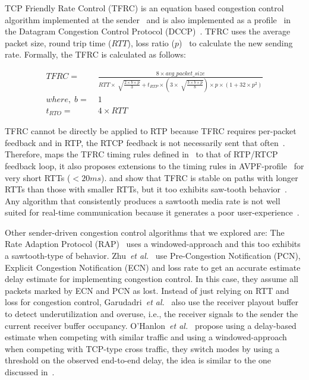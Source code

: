 TCP Friendly Rate Control (TFRC) is an equation based congestion control
algorithm implemented at the sender~\cite{tfrc_347397} and is also implemented
as a profile~\cite{rfc4342} in the Datagram Congestion Control Protocol
(DCCP)~\cite{rfc4340}. TFRC uses the average packet size, round trip time
($RTT$), loss ratio ($p$)~\cite{rfc3448} to calculate the new sending rate.
Formally, the TFRC is calculated as follows:

\begin{align*}
 TFRC = &\; \frac{8 \times avg\_packet\_size}
{RTT \times \sqrt[]{\frac{2 \times b \times p}{3}} + t_{RTP} \times 
\left( 3 \times \sqrt[]{\frac{3 \times b \times p}{8}}\right) \times p \times
\left( 1+32 \times p^2 \right)}\\
where,\; b = &\; 1\\
t_{RTO} = &\; 4 \times RTT
\end{align*}

TFRC cannot be directly be applied to RTP because TFRC requires per-packet
feedback and in RTP, the RTCP feedback is not necessarily sent that
often~\cite{draft.rmcat.feedback}. Therefore, \cite{draft.rtp.tfrc} maps the
TFRC timing rules defined in~\cite{rfc4828, rfc5348} to that of RTP/RTCP
feedback loop, it also proposes extensions to the timing rules in
AVPF-profile~\cite{rfc4585} for very short RTTs ($<20ms$).
\cite{Gharai06:ICME} and \cite{VladBalan:2007dq} show that TFRC is stable on
paths with longer RTTs than those with smaller RTTs, but it too exhibits
saw-tooth behavior~\cite{saurin:2006:thesis}. Any algorithm that consistently
produces a sawtooth media rate is not well suited for real-time communication
because it generates a poor user-experience~\cite{Gharai:2002wt,
Zink03subjectiveimpression}.

Other sender-driven congestion control algorithms that we explored are: The
Rate Adaption Protocol (RAP)~\cite{rap:752152} uses a windowed-approach and
this too exhibits a sawtooth-type of behavior. Zhu~\textit{et
al.}~\cite{rmcat-nada} use Pre-Congestion Notification (PCN), Explicit
Congestion Notification (ECN) and loss rate to get an accurate estimate delay
estimate for implementing congestion control. In this case, they assume all
packets marked by ECN and PCN as lost. Instead of just relying on RTT and loss
for congestion control, Garudadri~\textit{et al.}~\cite{4397059} also use the
receiver playout buffer to detect underutilization and overuse, i.e., the
receiver signals to the sender the current receiver buffer occupancy.
O'Hanlon~\textit{et al.}~\cite{rmcat-dflow} propose using a delay-based
estimate when competing with similar traffic and using a windowed-approach
when competing with TCP-type cross traffic, they switch modes by using a
threshold on the observed end-to-end delay, the idea is similar to the one
discussed in~\cite{budzisz2011fair}.




